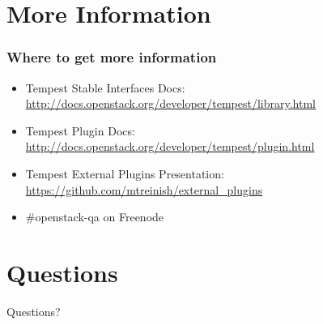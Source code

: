 \documentclass[aspectratio=169,11pt,hyperref={colorlinks=true}]{beamer}
\begin{document}
\section{More Information}
\begin{frame}
\frametitle{Where to get more information}
    \begin{itemize}
        \item Tempest Stable Interfaces Docs: \href{http://docs.openstack.org/developer/tempest/library.html}{http://docs.openstack.org/developer/tempest/library.html}
        \item Tempest Plugin Docs: \href{http://docs.openstack.org/developer/tempest/plugin.html}{http://docs.openstack.org/developer/tempest/plugin.html}
        \item Tempest External Plugins Presentation: \href{https://github.com/mtreinish/external_plugins}{https://github.com/mtreinish/external\_plugins}
        \item \#openstack-qa on Freenode
    \end{itemize}
\end{frame}

\section{Questions}
\begin{frame}[c]
    \begin{center}
        \Huge Questions?
    \end{center}
\end{frame}

\end{document}
